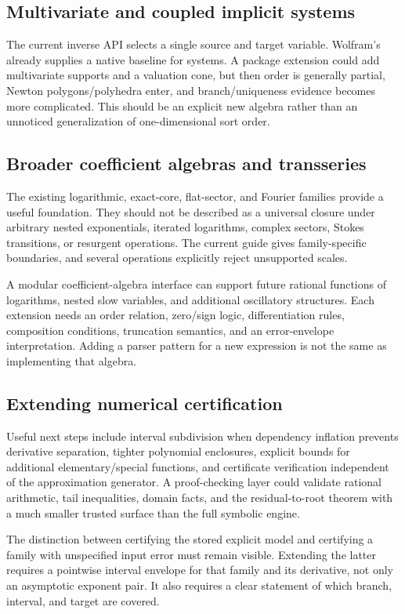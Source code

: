 \documentclass[11pt,letterpaper]{article}
\newcommand{\code}[1]{\texttt{\detokenize{#1}}}
\begin{document}
\subsection{Multivariate and coupled implicit systems}
The current inverse API selects a single source and target variable. Wolfram's \code{AsymptoticSolve} already supplies a native baseline for systems. A package extension could add multivariate supports and a valuation cone, but then order is generally partial, Newton polygons/polyhedra enter, and branch/uniqueness evidence becomes more complicated. This should be an explicit new algebra rather than an unnoticed generalization of one-dimensional sort order.\cite{guide,wl-asolve}

\subsection{Broader coefficient algebras and transseries}
The existing logarithmic, exact-core, flat-sector, and Fourier families provide a useful foundation. They should not be described as a universal closure under arbitrary nested exponentials, iterated logarithms, complex sectors, Stokes transitions, or resurgent operations. The current guide gives family-specific boundaries, and several operations explicitly reject unsupported scales.\cite{guide,operations}

A modular coefficient-algebra interface can support future rational functions of logarithms, nested slow variables, and additional oscillatory structures. Each extension needs an order relation, zero/sign logic, differentiation rules, composition conditions, truncation semantics, and an error-envelope interpretation. Adding a parser pattern for a new expression is not the same as implementing that algebra.

\subsection{Extending numerical certification}
Useful next steps include interval subdivision when dependency inflation prevents derivative separation, tighter polynomial enclosures, explicit bounds for additional elementary/special functions, and certificate verification independent of the approximation generator. A proof-checking layer could validate rational arithmetic, tail inequalities, domain facts, and the residual-to-root theorem with a much smaller trusted surface than the full symbolic engine.

The distinction between certifying the stored explicit model and certifying a family with unspecified input error must remain visible. Extending the latter requires a pointwise interval envelope for that family and its derivative, not only an asymptotic exponent pair. It also requires a clear statement of which branch, interval, and target are covered.\cite{certificates,guide}
\end{document}
